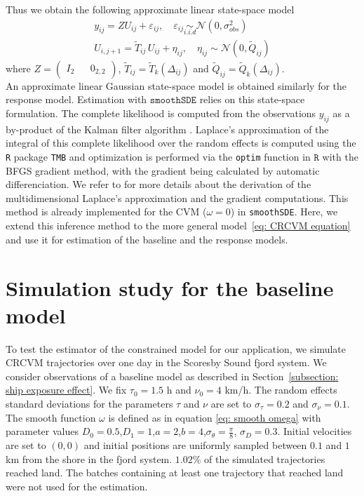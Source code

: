 \documentclass[aoas]{imsart}
\theoremstyle{definition}
\theoremstyle{remark}
\theoremstyle{remark}
\newcommand {\1}{\mathbb{1}}
\begin{document}
Thus we obtain the following approximate linear state-space model 
\begin{equation}
	\begin{array}{l}
		y_{ij}=ZU_{ij}+\varepsilon_{ij},  \quad 
		\varepsilon_{ij} \underset{i.i.d}{\sim} \mathcal{N}(0,\sigma_{obs}^2) \\
		U_{i,j+1}=\tilde{T}_{ij}\,U_{ij} + \eta_{ij}, \quad 
		\eta_{ij} \sim \mathcal{N}(0,\tilde{Q}_{ij})
	\end{array}
	\label{eq: RACVM state space}
\end{equation}
where $Z=\begin{pmatrix} I_2 && 0_{2,2}\end{pmatrix}$, $\tilde{T}_{ij}=\tilde{T}_k(\Delta_{ij})$ and $\tilde{Q}_{ij}=\tilde{Q}_k(\Delta_{ij})$.
\\
An approximate linear Gaussian state-space model is obtained similarly for the response model. Estimation with $\texttt{smoothSDE}$ relies on this state-space formulation.
The complete likelihood is computed from the observations $y_{ij}$ as a by-product of the Kalman filter algorithm \citep{michelot_varying-coefficient_2021}.
Laplace's approximation of the integral of this complete likelihood over the random effects is computed using the \texttt{R} package \texttt{TMB}  and optimization is performed via the \texttt{optim} function in $\texttt{R}$ with the BFGS gradient method, with the gradient being calculated by automatic differenciation. We refer to \citep{kristensen_tmb_2016} for more details about the derivation of the multidimensional Laplace's approximation and the gradient computations.
This method is already implemented for the CVM ($\omega=0$) in \texttt{smoothSDE}. Here, we extend this inference method to the more general model~\eqref{eq: CRCVM equation} and use it for estimation of the baseline and the response models.




\section{Simulation study for the baseline model}
\label{section: simulation constrained motion}
To test the estimator of the constrained model for our application, we simulate CRCVM trajectories over one day in the Scoresby Sound fjord system. We consider observations of a baseline model as described in Section~\ref{subsection: ship exposure effect}. We fix $\tau_0=1.5$ h and $\nu_0=4$ km/h. The random effects standard deviations for the parameters $\tau$ and $\nu$ are set to $\sigma_{\tau}=0.2$ and $\sigma_{\nu}=0.1$. The smooth function $\omega$ is defined as in equation \eqref{eq: smooth omega} with parameter values $D_0=0.5$,$D_1=1$,$a=2$,$b=4$,$\sigma_\theta=\frac{\pi}{8}$, $\sigma_D=0.3$. Initial velocities are set to $(0,0)$ and initial positions are uniformly sampled between $0.1$ and $1$ km from the shore in the fjord system. $1.02\%$ of the simulated trajectories reached land. The batches containing at least one trajectory that reached land were not used for the estimation.\\
\end{document}
